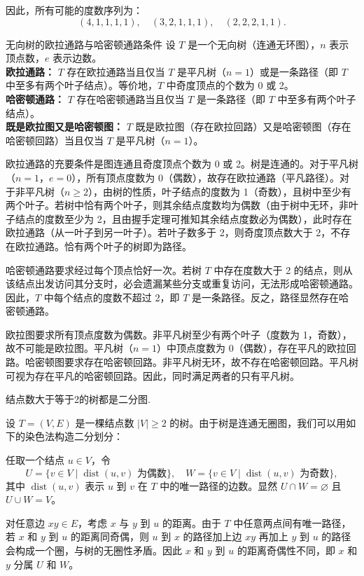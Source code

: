 \documentclass[lang=cn,11pt]{elegantbook}
\begin{document}
因此，所有可能的度数序列为：
\[
(4,1,1,1,1), \quad (3,2,1,1,1), \quad (2,2,2,1,1).
\]
\begin{theorem}{无向树的欧拉通路与哈密顿通路条件}
设 $T$ 是一个无向树（连通无环图），$n$ 表示顶点数，$e$ 表示边数。\\
\textbf{欧拉通路：} $T$ 存在欧拉通路当且仅当 $T$ 是平凡树（$n=1$）或是一条路径（即 $T$ 中至多有两个叶子结点）。等价地，$T$ 中奇度顶点的个数为 0 或 2。\\
\textbf{哈密顿通路：} $T$ 存在哈密顿通路当且仅当 $T$ 是一条路径（即 $T$ 中至多有两个叶子结点）。\\
\textbf{既是欧拉图又是哈密顿图：} $T$ 既是欧拉图（存在欧拉回路）又是哈密顿图（存在哈密顿回路）当且仅当 $T$ 是平凡树（$n=1$）。
\end{theorem}
欧拉通路的充要条件是图连通且奇度顶点个数为 0 或 2。树是连通的。对于平凡树（$n=1$，$e=0$），所有顶点度数为 0（偶数），故存在欧拉通路（平凡路径）。对于非平凡树（$n\ge 2$），由树的性质，叶子结点的度数为 1（奇数），且树中至少有两个叶子。若树中恰有两个叶子，则其余结点度数均为偶数（由于树中无环，非叶子结点的度数至少为 2，且由握手定理可推知其余结点度数必为偶数），此时存在欧拉通路（从一叶子到另一叶子）。若叶子数多于 2，则奇度顶点数大于 2，不存在欧拉通路。恰有两个叶子的树即为路径。

哈密顿通路要求经过每个顶点恰好一次。若树 $T$ 中存在度数大于 2 的结点，则从该结点出发访问其分支时，必会遗漏某些分支或重复访问，无法形成哈密顿通路。因此，$T$ 中每个结点的度数不超过 2，即 $T$ 是一条路径。反之，路径显然存在哈密顿通路。

欧拉图要求所有顶点度数为偶数。非平凡树至少有两个叶子（度数为 1，奇数），故不可能是欧拉图。平凡树（$n=1$）中顶点度数为 0（偶数），存在平凡的欧拉回路。哈密顿图要求存在哈密顿回路。非平凡树无环，故不存在哈密顿回路。平凡树可视为存在平凡的哈密顿回路。因此，同时满足两者的只有平凡树。
\begin{theorem}
结点数大于等于2的树都是二分图.
\end{theorem}
设 \(T = (V, E)\) 是一棵结点数 \(|V| \ge 2\) 的树。由于树是连通无圈图，我们可以用如下的染色法构造二分划分：

任取一个结点 \(u \in V\)，令
\[
U = \{ v \in V \mid \operatorname{dist}(u, v) \text{ 为偶数} \},
\quad W = \{ v \in V \mid \operatorname{dist}(u, v) \text{ 为奇数} \},
\]
其中 \(\operatorname{dist}(u, v)\) 表示 \(u\) 到 \(v\) 在 \(T\) 中的唯一路径的边数。显然 \(U \cap W = \varnothing\) 且 \(U \cup W = V\)。

对任意边 \(xy \in E\)，考虑 \(x\) 与 \(y\) 到 \(u\) 的距离。由于 \(T\) 中任意两点间有唯一路径，若 \(x\) 和 \(y\) 到 \(u\) 的距离同奇偶，则 \(u\) 到 \(x\) 的路径加上边 \(xy\) 再加上 \(y\) 到 \(u\) 的路径会构成一个圈，与树的无圈性矛盾。因此 \(x\) 和 \(y\) 到 \(u\) 的距离奇偶性不同，即 \(x\) 和 \(y\) 分属 \(U\) 和 \(W\)。
\end{document}
